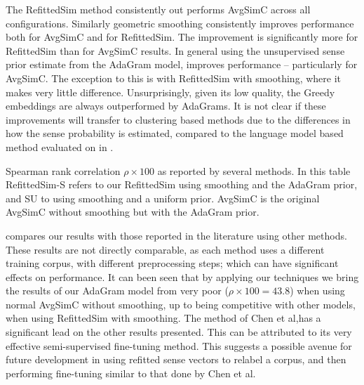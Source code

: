 \documentclass{sig-alternate}
\begin{document}
The RefittedSim method consistently out performs AvgSimC across all configurations.
Similarly geometric smoothing consistently improves performance both for AvgSimC and for RefittedSim. The improvement is significantly more for RefittedSim than for AvgSimC results.
In general using the unsupervised sense prior estimate from the AdaGram model, improves performance -- particularly for AvgSimC. The exception to this is with RefittedSim with smoothing, where it makes very little difference. 
Unsurprisingly, given its low quality, the Greedy embeddings are always outperformed by AdaGrams.
It is not clear if these improvements will transfer to clustering based methods due to the differences in how the sense probability is estimated, compared to the language model based method evaluated on in .

\begin{table}
	\begin{adjustbox}{max width=\columnwidth}
	\end{adjustbox}
	\caption{Spearman rank correlation $\rho \times 100$  as reported by several methods\label{swscEvery}. In this table RefittedSim-S refers to our RefittedSim using smoothing and the AdaGram prior, and SU to using smoothing and a uniform prior. AvgSimC is the original AvgSimC without smoothing but with the AdaGram prior.}
\end{table}

 compares our results with those reported in the literature using other methods. These results are not directly comparable, as each method uses a different training corpus, with different preprocessing steps;  which can have significant effects on performance.
It can been seen that by applying our techniques we bring the results of our AdaGram model from very poor ($\rho \times 100 = 43.8$) when using normal AvgSimC without smoothing, up to being competitive with other models, when using RefittedSim with smoothing. The method of Chen et al\parencite{Chen2014},has a significant lead on the other results presented. This can be attributed to its very effective semi-supervised fine-tuning method. This suggests a possible avenue for future development in using refitted sense vectors to  relabel a corpus, and then performing fine-tuning similar to that done by Chen et al.
\end{document}
